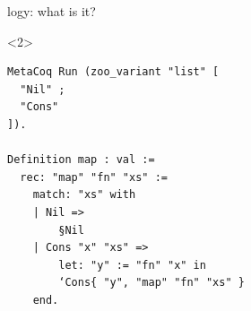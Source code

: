 \begin{frame}[fragile]{\Zoo[]logy: what is it?}

\begin{overbox}<2>
    \begin{verbatim}
MetaCoq Run (zoo_variant "list" [
  "Nil" ;
  "Cons"
]).

Definition map : val :=
  rec: "map" "fn" "xs" :=
    match: "xs" with
    | Nil =>
        §Nil
    | Cons "x" "xs" =>
        let: "y" := "fn" "x" in
        ‘Cons{ "y", "map" "fn" "xs" }
    end.
    \end{verbatim}
\end{overbox}


\end{frame}
